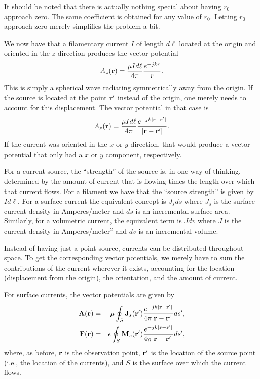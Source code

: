 It should be noted that there is actually nothing special about having
$r_0$ approach zero.  The same coefficient is obtained for any value
of $r_0$.  Letting $r_0$ approach zero merely simplifies the problem a
bit.

We now have that a filamentary current $I$ of length $d\ell$
located at the origin and oriented in the $z$ direction produces the
vector potential
\begin{equation}
  A_z(\mathbf{r}) = \frac{\mu I d\ell}{4 \pi}\frac{e^{-jkr}}{r}.
\end{equation}
This is simply a spherical wave radiating symmetrically away from the
origin.  If the source is located at the point $\mathbf{r}'$ instead of the
origin, one merely needs to account for this displacement.  The vector
potential in that case is
\begin{equation}
  A_z(\mathbf{r}) = \frac{\mu I d\ell}{4 \pi}
               \frac{e^{-jk|\mathbf{r}-\mathbf{r}'|}}{|\mathbf{r}-\mathbf{r}'|}.
\end{equation}
If the current was oriented in the $x$ or $y$ direction, that would
produce a vector potential that only had a $x$ or $y$ component,
respectively.  

For a current source, the ``strength'' of the source is, in one way of
thinking, determined by the amount of current that is flowing times
the length over which that current flows.  For a filament we have that
the ``source strength'' is given by $I d\ell$.  For a surface
current the equivalent concept is $J_s ds$ where $J_s$ is the
surface current density in Amperes/meter and $ds$ is an
incremental surface area.  Similarly, for a volumetric current, the 
equivalent term is $J dv$ where $J$ is the current density in
Amperes/meter$^2$ and $dv$ is an incremental volume.

Instead of having just a point source, currents can be distributed
throughout space.  To get the corresponding vector potentials, we
merely have to sum the contributions of the current wherever it
exists, accounting for the location (displacement from the origin),
the orientation, and the amount of current.

For surface currents, the vector potentials are given by
\begin{eqnarray}
\mathbf{A}(\mathbf{r}) &=&\mu \oint_S \mathbf{J}_s(\mathbf{r}')
             \frac{e^{-jk|\mathbf{r}-\mathbf{r}'|}}{4\pi|\mathbf{r}-\mathbf{r}'|}
             ds',  \label{eq:aVecThreeD} \\
\mathbf{F}(\mathbf{r}) &=&\epsilon \oint_S \mathbf{M}_s(\mathbf{r}')
             \frac{e^{-jk|\mathbf{r}-\mathbf{r}'|}}{4\pi|\mathbf{r}-\mathbf{r}'|}
             ds', \label{eq:fVecThreeD} 
\end{eqnarray}
where, as before, $\mathbf{r}$ is the observation point, $\mathbf{r}'$ is the
location of the source point (i.e., the location of the currents), and
$S$ is the surface over which the current flows.

